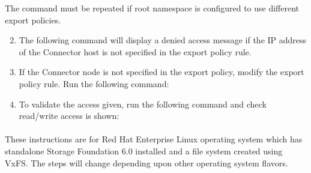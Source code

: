 \documentclass[letterpaper,10pt,english]{sphinxmanual}
\begin{document}
The command must be repeated if root namespace is configured to use different export policies.
\begin{enumerate}
\setcounter{enumi}{1}
\item {} 
The following command will display a denied access message if the IP address of the Connector host is not specified in the export policy rule.

\end{enumerate}
\begin{quote}

\end{quote}
\begin{enumerate}
\setcounter{enumi}{2}
\item {} 
If the Connector node is not specified in the export policy, modify the export policy rule. Run the following command:

\end{enumerate}
\begin{quote}

\end{quote}
\begin{enumerate}
\setcounter{enumi}{3}
\item {} 
To validate the access given, run the following command and check read/write access is shown:

\end{enumerate}
\begin{quote}

\end{quote}


\paragraph{}
\label{\detokenize{mcdmp_app_ug:enabling-export-of-unix-linux-nfs-shares-on-vxfs-filers}}
These instructions are for Red Hat Enterprise Linux operating system which has standalone Storage Foundation 6.0 installed and a file system created using VxFS. The steps will change depending upon other operating system flavors.
\end{document}
